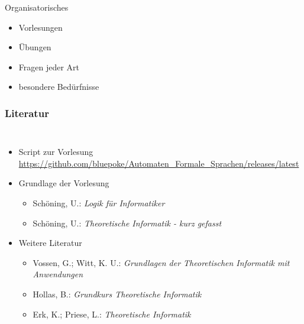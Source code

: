 \begin{frame}
	\titlepage
\end{frame}


\begin{frame}{Organisatorisches}
	\begin{itemize}
		\item Vorlesungen
		\item Übungen
		\item Fragen jeder Art
		\item besondere Bedürfnisse
	\end{itemize}
\end{frame}

\AtBeginSection{
	\begin{frame}
		\sectionpage
		\tableofcontents[sectionstyle=hide/hide,subsectionstyle=show/show/hide]
	\end{frame}
}

\begin{frame}
	\frametitle{Literatur}
	\begin{columns}
			\begin{itemize}
				\item Script zur Vorlesung \\
				{\small \url{https://github.com/bluepoke/Automaten_Formale_Sprachen/releases/latest}}
				\item Grundlage der Vorlesung
				\begin{itemize}
					\item Schöning, U.: \textit{Logik für Informatiker}
					\item Schöning, U.: \textit{Theoretische Informatik - kurz gefasst}
				\end{itemize}
				\item Weitere Literatur
				\begin{itemize}
					\item Vossen, G.; Witt, K. U.: \textit{Grundlagen der Theoretischen Informatik mit Anwendungen}
					\item Hollas, B.: \textit{Grundkurs Theoretische Informatik}
					\item Erk, K.;  Priese, L.: \textit{Theoretische Informatik}
				\end{itemize}
			\end{itemize}
	\end{columns}
\end{frame}

